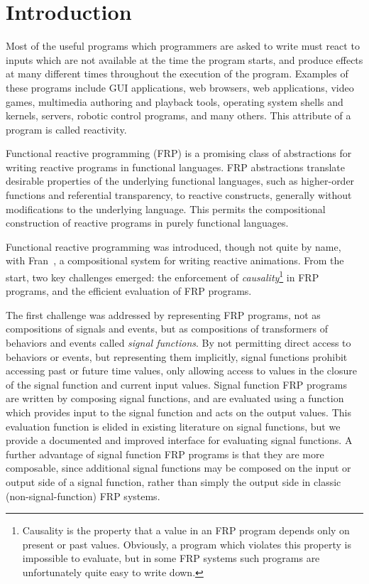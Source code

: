 \chapter{Introduction}
\label{chapter:Introduction}

Most of the useful programs which programmers are asked to write must react to inputs which are not available at the time the program starts,
and produce effects at many different times throughout the execution of the program. Examples of these programs include GUI applications,
web browsers, web applications, video games, multimedia authoring and playback tools, operating system shells and kernels, servers,
robotic control programs, and many others. This attribute of a program is called
reactivity.

Functional reactive programming (FRP) is a promising class of abstractions for writing reactive programs in functional languages. FRP 
abstractions translate desirable properties of the underlying functional languages, such as higher-order functions and referential
transparency, to reactive constructs, generally without modifications to the underlying language. This permits the compositional
construction of reactive programs in purely functional languages.

Functional reactive programming was introduced, though not quite by name, with Fran~\cite{Elliott1997}, a compositional system for writing
reactive animations. From the start, two key challenges emerged: the enforcement of {\em causality}\footnote{Causality is the property 
that a value in an FRP program depends only on present or past values. Obviously, a program which violates this property is impossible to
evaluate, but in some FRP systems such programs are unfortunately quite easy to write down.} in FRP programs, and the efficient
evaluation of FRP programs.

The first challenge was addressed by representing FRP programs, not as
compositions of signals and events, but as compositions of transformers of
behaviors and events called {\em signal functions}. By not permitting direct
access to behaviors or events, but representing them implicitly, signal
functions prohibit accessing past or future time values, only allowing access to
values in the closure of the signal function and current input values. Signal
function FRP programs are written by composing signal functions, and are
evaluated using a function which provides input to the signal function and acts
on the output values. This evaluation function is elided in existing literature
on signal functions, but we provide a documented and improved interface for
evaluating signal functions. A further advantage of signal function FRP programs
is that they are more composable, since additional signal functions may be
composed on the input or output side of a signal function, rather than simply
the output side in classic (non-signal-function) FRP systems.

